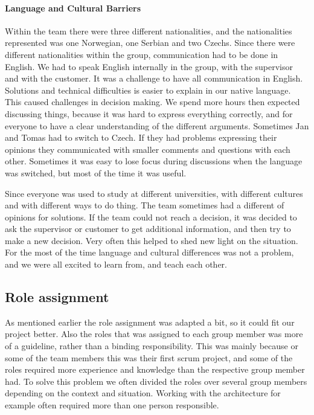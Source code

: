 \paragraph{Language and Cultural Barriers}

Within the team there were three different nationalities, and the nationalities represented was one Norwegian, one Serbian and two Czechs. Since there were different nationalities within the group, communication had to be done in English. We had to speak English internally in the group, with the supervisor and with the customer. It was a challenge to have all communication in English. Solutions and 
technical difficulties is easier to explain in our native language. This caused challenges in decision making. We spend more hours then expected discussing things, because it was hard to express everything correctly, and for everyone to have a clear understanding of the different arguments. Sometimes Jan and Tomas had to switch to Czech. If they had problems expressing their opinions they communicated with smaller comments and questions with each other. Sometimes it was easy to lose focus during discussions when the language was switched, but most of the time it was useful.

Since everyone was used to study at different universities, with different cultures and with different ways to do thing. The team sometimes had a different of opinions for solutions. If the team could not reach a decision, it was decided to ask the supervisor or customer to get additional information, and then try to make a new decision. Very often this helped to shed new light on the situation.  For the most of the time language and cultural differences was not a problem, and we were all excited to learn from, and teach each other. 

\subsection{Role assignment}
As mentioned earlier the role assignment was adapted a bit, so it could fit our project better. Also the roles that was assigned to each group member was more of a guideline, rather than a binding responsibility. This was mainly because or some of the team members this was their first scrum project, and some of the roles required more experience and knowledge than the respective group member had. To solve this problem we often divided the roles over several group members depending on the context and situation. Working with the architecture for example often required more than one person responsible. 

